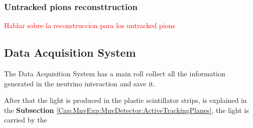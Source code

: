 \subsubsection{Untracked pions reconsttruction}
\label{Cap:MnvExp:MnvDetector:DataReconstruction:Untrackedpions}
\textcolor{red}{Hablar sobre la reconstruccion para los untracked pions}

\subsection{Data Acquisition System }
\label{Cap:MnvExp:MnvDetector:DAQ}

The Data Acquisition System has a main roll collect all the information generated in the neutrino interaction and save it. 

After that the light is produced in the plastic scintillator strips, is explained in the \textbf{Subsection} \ref{Cap:MnvExp:MnvDetector:ActiveTrackingPlanes}, the light is carried by the 







